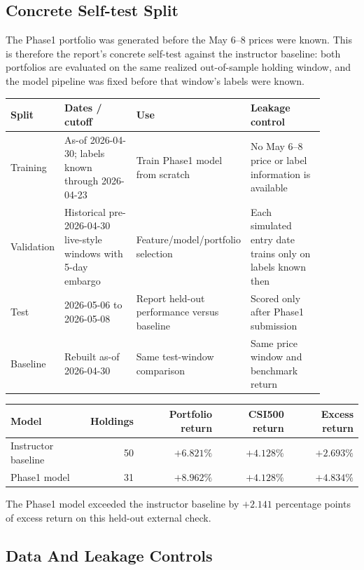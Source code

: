 \documentclass[11pt]{article}
\begin{document}
\subsection{Concrete Self-test Split}

The Phase1 portfolio was generated before the May 6--8 prices were known. This
is therefore the report's concrete self-test against the instructor baseline:
both portfolios are evaluated on the same realized out-of-sample holding
window, and the model pipeline was fixed before that window's labels were
known.

\begin{table}[h]
\centering
\begin{tabular}{p{0.16\linewidth}p{0.25\linewidth}p{0.23\linewidth}p{0.25\linewidth}}
\toprule
Split & Dates / cutoff & Use & Leakage control \\
\midrule
Training & As-of 2026-04-30; labels known through 2026-04-23 & Train Phase1 model from scratch & No May 6--8 price or label information is available \\
Validation & Historical pre-2026-04-30 live-style windows with 5-day embargo & Feature/model/portfolio selection & Each simulated entry date trains only on labels known then \\
Test & 2026-05-06 to 2026-05-08 & Report held-out performance versus baseline & Scored only after Phase1 submission \\
Baseline & Rebuilt as-of 2026-04-30 & Same test-window comparison & Same price window and benchmark return \\
\bottomrule
\end{tabular}
\end{table}

\begin{table}[h]
\centering
\begin{tabular}{lrrrr}
\toprule
Model & Holdings & Portfolio return & CSI500 return & Excess return \\
\midrule
Instructor baseline & 50 & \(+6.821\%\) & \(+4.128\%\) & \(+2.693\%\) \\
Phase1 model & 31 & \(+8.962\%\) & \(+4.128\%\) & \(+4.834\%\) \\
\bottomrule
\end{tabular}
\end{table}

The Phase1 model exceeded the instructor baseline by \(+2.141\) percentage
points of excess return on this held-out external check.

\subsection{Data And Leakage Controls}
\end{document}
